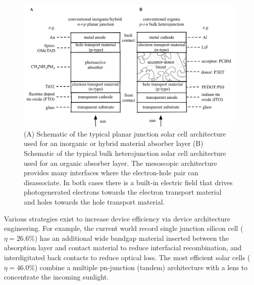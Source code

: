 \begin{figure}[h]
 \centering
   \includegraphics[width=1.0\columnwidth]{figures/ch1/PVarchitecture.png}
   \caption[Typical solar cell architectures]{(A) Schematic of the typical planar junction solar cell architecture used for an inorganic or hybrid material absorber layer (B) Schematic of the typical bulk heterojunction solar cell architecture used for an organic absorber layer. The mesoscopic architecture provides many interfaces where the electron-hole pair can disassociate.  In both cases there is a built-in electric field that drives photogenerated electrons towards the electron transport material and holes towards the hole transport material.}
   \label{SC_architecture}
 \end{figure}



Various strategies exist to increase device efficiency via device architecture engineering. For example, the current world record single junction silicon cell ($\eta=26.6\%$) has an additional wide bandgap material inserted between the absorption layer and contact material to reduce interfacial recombination, and interdigitated back contacts to reduce optical loss.\autocite{Yoshikawa2017} The most efficient solar cells ($\eta=46.0\%$) combine a multiple pn-junction (tandem) architecture with a lens to concentrate the incoming sunlight.

